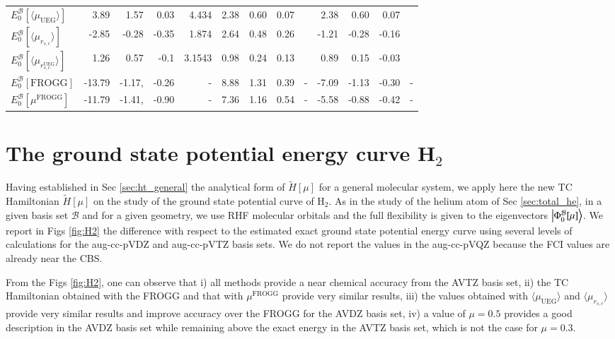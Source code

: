 \documentclass[aip,jcp,reprint,noshowkeys,superscriptaddress,twocolumn]{revtex4-1}
\newcommand{\frogg}[0]{\text{FROGG}}
\newcommand{\mfrogg}[0]{\mu^\text{FROGG}}
\newcommand{\phimub}[0]{\Phi^{\mathcal{B}}_0[\mu]}
\newcommand{\basis}[0]{\mathcal{B}}
\newcommand{\muuegav}{\langle \mu_{\text{UEG}}\rangle}
\newcommand{\murscav}{\langle \mu_{r_{s,c}}\rangle}
\newcommand{\mursclda}{\langle \mu_{r_{s,c}^{\text{UEG}}}\rangle}
\begin{document}
\begin{table}
\begin{ruledtabular}
\begin{tabular}{l|rrr|r||rrr|r||rrr|r|}
$E_0^{\basis}[\muuegav]$ &  3.89   &   1.57   &  0.03    &4.434      & 2.38    &    0.60  &    0.07 &          &   2.38   &   0.60   &    0.07&      \\   
$E_0^{\basis}[\murscav]$ &  -2.85  &  -0.28   & -0.35    &1.874      & 2.64    &    0.48  &    0.26 &          &  -1.21   &  -0.28   &   -0.16&      \\   
$E_0^{\basis}[\mursclda]$&  1.26   &   0.57   & -0.1     &3.1543     & 0.98    &    0.24  &    0.13 &          &   0.89   &   0.15   &   -0.03&      \\   
$E_0^{\basis}[\frogg]$   &  -13.79 &  -1.17,  & -0.26    &    -      & 8.88    &    1.31  &    0.39 &   -      & -7.09    &  -1.13   &   -0.30&    - \\
$E_0^{\basis}[\mfrogg]$  &  -11.79 &  -1.41,  & -0.90    &    -      & 7.36    &    1.16  &    0.54 &   -      & -5.58    &  -0.88   &   -0.42&    - \\
\end{tabular}
\end{ruledtabular}
\label{table_conv_e_mu_iso}
\end{table}

\section{The ground state potential energy curve H$_2$}
Having established in Sec \ref{sec:ht_general} the analytical form of $ \tilde{H}[\mu]$ for a general molecular system, we apply here the new TC Hamiltonian $ \tilde{H}[\mu]$ on the study of the ground state potential curve of H$_2$. 
As in the study of the helium atom of Sec \ref{sec:total_he}, in a given basis set $\basis$ and for a given geometry, we use RHF molecular orbitals and the full flexibility is given to the eigenvectors $\ket{\phimub}$. 
We report in Figs \ref{fig:H2} the difference with respect to the estimated exact ground state potential energy curve using several levels of calculations for the aug-cc-pVDZ and aug-cc-pVTZ basis sets. We do not report the values in the aug-cc-pVQZ because the FCI values are already near the CBS. 

From the Figs \ref{fig:H2}, one can observe that i) all methods provide a near chemical accuracy from the AVTZ basis set, ii) the TC Hamiltonian obtained with the FROGG and that with $\mfrogg$ provide very similar results, iii) the values obtained with $\muuegav$ and $\murscav$ provide very similar results and improve accuracy over the FROGG for the AVDZ basis set, iv) a value of $\mu = 0.5$ provides a good description in the AVDZ basis set while remaining above the exact energy in the AVTZ basis set, which is not the case for $\mu=0.3$. 
\end{document}
